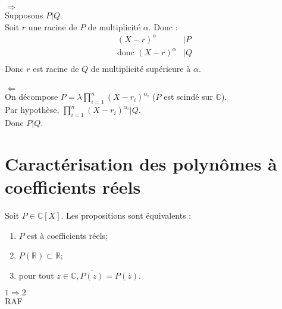 \documentclass[../main.tex]{subfiles}
\begin{document}
$\boxed{\Rightarrow}$ \\
Supposons $P|Q$. \\
Soit $r$ une racine de $P$ de multiplicité $\alpha$. Donc : 
\begin{align*}
    (X - r)^{\alpha} &| P \\
    \text{donc } (X - r)^{\alpha} &| Q \\
\end{align*}
Donc $r$ est racine de $Q$ de multiplicité supérieure à $\alpha$. \\ \\

$\boxed{\Leftarrow}$ \\
On décompose  $P = \lambda \prod\limits_{i=1}^{n} (X - r_i)^{\alpha_i}$ ($P$ est scindé sur $\mathbb{C}$). \\
Par hypothèse, $\prod\limits_{i=1}^{n} (X - r_i)^{\alpha_i} | Q$. \\
Donc $P | Q$. 

\section{Caractérisation des polynômes à coefficients réels}
\begin{tcolorbox}[title=Théorème 16.99, title filled=false, colframe=orange, colback=orange!10!white]
    Soit $P \in \mathbb{C}[X]$. Les propositions sont équivalents : 
    \begin{enumerate}
        \item $P$ est à coefficients réels;
        \item $P(\mathbb{R}) \subset \mathbb{R}$;
        \item pour tout $z \in \mathbb{C}, \overline{P(z)} = P(\overline{z})$.
    \end{enumerate}
\end{tcolorbox}

$\boxed{1 \Rightarrow 2}$ \\
RAF \\ \\
\end{document}
